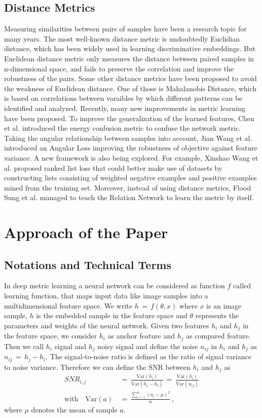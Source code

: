 \documentclass[12pt,paper=a4]{scrartcl}
\theoremstyle{break}
\begin{document}
\subsection{Distance Metrics}
Measuring similarities between pairs of samples have been a research topic for many years. The most well-known distance metric is undoubtedly Euclidian distance, which has been widely used in learning discriminative embeddings. But Euclidean distance metric only measures the distance between paired samples in n-dimensional space, and fails to preserve the correlation and improve the robustness of the pairs. Some other distance metrics have been proposed to avoid the weakness of Euclidean distance. One of those is Mahalanobis Distance, which is based on correlations between varaibles by which different patterns can be identified and analyzed. Recently, many new improvements in metric learning have been proposed. To improve the generalization of the learned features, Chen et al.\cite{chen} introduced the energy confusion metric to confuse the network metric. Taking the angular relationship between samples into account, Jian Wang et al.\cite{wang} introduced an Angular Loss improving the robustness of objective against feature variance. A new framework is also being explored. For example, Xinshao Wang et al.\cite{wang2} proposed ranked list loss that could better make use of datasets by constructing lists consisting of weighted negative examples and positive examples mined from the training set. Moreover, instead of using distance metrics, Flood Sung et al. managed to teach the Relation Network to learn the metric by itself.\cite{source1}
\section{Approach of the Paper}
\subsection{Notations and Technical Terms}
In deep metric learning a neural network can be considered as function $f$ called learning function, that maps input data like image samples into a multidimensional feature space. We write $h\, = \, f(\theta, x)$ where $x$ is an image sample, $h$ is the embedded sample in the feature space and $\theta$ represents the parameters and weights of the neural network. Given two features $h_i$ and $h_j$ in the feature space, we consider $h_i$ as anchor feature and $h_j$ as compared feature. Then we call $h_i$ signal and $h_j$ noisy signal and define the noise $n_{ij}$ in $h_i$ and $h_j$ as $n_{ij}\,=\,h_j-h_i$. The signal-to-noise ratio is defined as the ratio of signal variance to noise variance. Therefore we can define the SNR between $h_i$ and $h_j$ as
\begin{align}
SNR_{i,j}\,&=\,\frac{\mathrm{Var}(h_i)}{\mathrm{Var}(h_j-h_i)}\,=\,\frac{\mathrm{Var}(h_i)}{\mathrm{Var}(n_{ij})} \\
\text{with}\quad \mathrm{Var}(a)\,&=\,\frac{\sum_{i=1}^n(a_i-\mu)^2}{n} \, ,
\end{align}
where $\mu$ denotes the mean of sample $a$.
\end{document}
